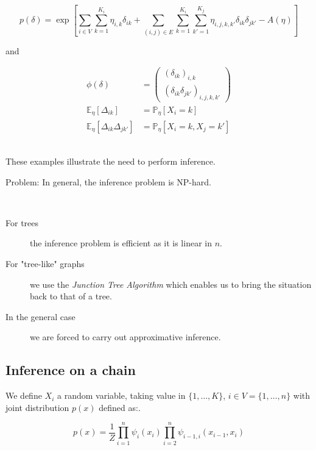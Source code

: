 \documentclass[12pt,a4paper]{report}
\newcommand{\forscribe}[2]{#2}  %
\begin{document}
\begin{equation}
	p(\delta) = \exp \left [ \sum_{i \in V} \sum_{k=1}^{K_i} \eta_{i,k} \delta_{ik} \forscribe{ }{+} \sum_{(i,j) \in E} \sum_{k=1}^{K_i} \sum_{k' = 1}^{K_j} \eta_{i,j,k,k'} \delta_{ik} \delta_{jk'} - A(\eta)\right ]
\end{equation}

and

\begin{align}
	\phi(\delta) &= 
	\begin{pmatrix}
		(\delta_{ik})_{i,k} \\
		(\delta_{ik}\delta_{jk'})_{i,j,k,k'}
	\end{pmatrix} \\
	\mathbb{E}_{\eta} [\Delta_{ik}] 				&= \mathbb{P}_{\eta} [X_i = k]\\
	\mathbb{E}_{\eta} [\Delta_{ik}\Delta_{jk'}] 		&= \mathbb{P}_{\eta} [X_i = k, X_j = k']
\end{align}

\ \\
These examples illustrate the need to perform inference.

\begin{danger}
	Problem: In general, the inference problem is NP-hard.
\end{danger}
\ \\
\begin{description}
	\item[For trees] the inference problem is efficient as it is linear in $n$.
	\item[For "tree-like" graphs] we use the \emph{Junction Tree Algorithm} which enables us to bring the situation back to that of a tree.
	\item[In the general case] we are forced to carry out approximative inference.
\end{description}

\subsection{Inference on a chain}

We define \( X_i \) a random variable, taking value in \( \{1,\dots ,K\} \), \( i \in  V = \{1 , \dots , n\} \) \forscribe{}{with joint distribution $p(x)$ defined as:}.

\begin{equation}
	p(x) = \frac{1}{Z} \prod_{i=1}^{n} \psi_i (x_i) \prod_{i=2}^{n} \psi_{i-1,i} (x_{i-1},x_i)
\end{equation}
\end{document}

